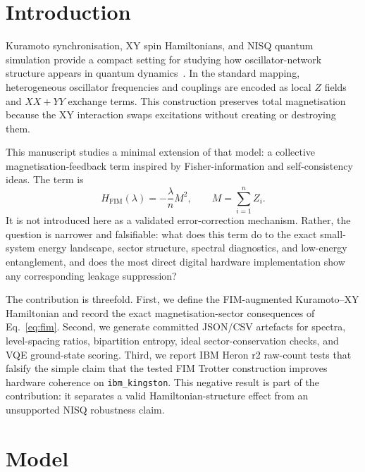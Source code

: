 \documentclass[preprint,aps,physrev,superscriptaddress,floatfix,longbibliography]{revtex4-2}
\begin{document}
\maketitle

\section{Introduction}

Kuramoto synchronisation, XY spin Hamiltonians, and NISQ quantum simulation
provide a compact setting for studying how oscillator-network structure appears
in quantum dynamics~\cite{Kuramoto1975,Acebron2005,Barahona1982}. In the
standard mapping, heterogeneous oscillator frequencies and couplings are encoded
as local $Z$ fields and $XX+YY$ exchange terms. This construction preserves
total magnetisation because the XY interaction swaps excitations without
creating or destroying them.

This manuscript studies a minimal extension of that model: a collective
magnetisation-feedback term inspired by Fisher-information and
self-consistency ideas. The term is
%
\begin{equation}
  H_{\mathrm{FIM}}(\lambda) = -\frac{\lambda}{n} M^2,
  \qquad
  M = \sum_{i=1}^{n} Z_i.
  \label{eq:fim}
\end{equation}
%
It is not introduced here as a validated error-correction mechanism. Rather,
the question is narrower and falsifiable: what does this term do to the exact
small-system energy landscape, sector structure, spectral diagnostics, and
low-energy entanglement, and does the most direct digital hardware
implementation show any corresponding leakage suppression?

The contribution is threefold. First, we define the FIM-augmented
Kuramoto--XY Hamiltonian and record the exact magnetisation-sector consequences
of Eq.~\eqref{eq:fim}. Second, we generate committed JSON/CSV artefacts for
spectra, level-spacing ratios, bipartition entropy, ideal sector-conservation
checks, and VQE ground-state scoring. Third, we report IBM Heron r2 raw-count
tests that falsify the simple claim that the tested FIM Trotter construction
improves hardware coherence on \texttt{ibm\_kingston}. This negative result is
part of the contribution: it separates a valid Hamiltonian-structure effect
from an unsupported NISQ robustness claim.

\section{Model}
\end{document}
